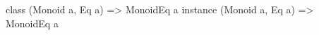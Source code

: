 \begin{code}
class    (Monoid a, Eq a) => MonoidEq a
instance (Monoid a, Eq a) => MonoidEq a
\end{code}
